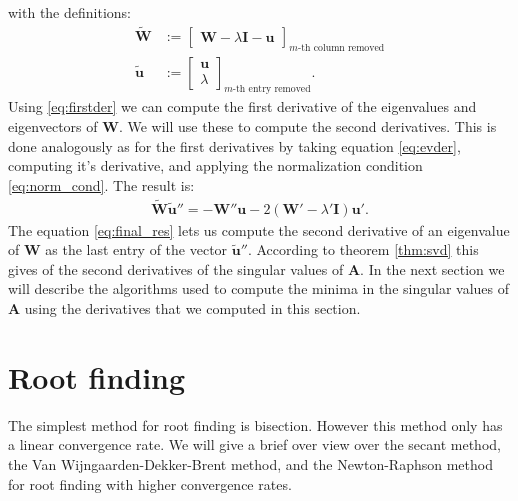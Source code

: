 \documentclass[a4paper, oneside]{discothesis}
\begin{document}
with the definitions:
\begin{align}
	\mathbf{\tilde{W}} &:= 
	\begin{bmatrix}
		\mathbf{W}-\lambda\mathbf{I}  -\mathbf{u}
	\end{bmatrix}
	_{\text{$m$-th column removed}} \\
	\mathbf{\tilde{u}} &:=  
	\begin{bmatrix}
		\mathbf{u} \\
		\lambda
	\end{bmatrix} 
	_{\text{$m$-th entry removed}}.
\end{align}
Using \ref{eq:firstder} we can compute the first derivative of the eigenvalues and eigenvectors of $\mathbf{W}$.
We will use these to compute the second derivatives.
This is done analogously as for the first derivatives by taking equation \ref{eq:evder}, computing it's derivative, and applying the normalization condition \ref{eq:norm_cond}.
The result is:
\begin{align}
	\mathbf{\tilde{W}} \mathbf{\tilde{u}}'' 
	= -\mathbf{W}''\mathbf{u} - 2(\mathbf{W}'-\lambda'\mathbf{I})\mathbf{u}'. \label{eq:final_res}
\end{align}
The equation \ref{eq:final_res} lets us compute the second derivative of an eigenvalue of $\mathbf{W}$ as the last entry of the vector $\mathbf{\tilde{u}}''$.
According to theorem \ref{thm:svd} this gives of the second derivatives of the singular values of $\mathbf{A}$.
In the next section we will describe the algorithms used to compute the minima in the singular values of $\mathbf{A}$ using the derivatives that we computed in this section.

\section{Root finding} \label{sec:roots}
The simplest method for root finding is bisection. 
However this method only has a linear convergence rate.
We will give a brief over view over the secant method, the Van Wijngaarden-Dekker-Brent method, and the Newton-Raphson method for root finding with higher convergence rates.
\end{document}
